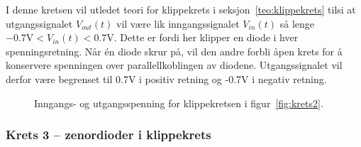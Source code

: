 \vspace{1em}

\noindent
I denne kretsen vil utledet teori for klippekrets i seksjon~\ref{teo:klippekrets} tilsi at utgangssignalet $V_{out}(t)$ vil være lik inngangssignalet $V_{in}(t)$ så lenge $-0.7\text{V} < V_{in}(t) < 0.7\text{V}$. Dette er fordi her klipper en diode i hver spenningsretning. Når én diode skrur på, vil den andre forbli åpen krets for å konservere spenningen over parallellkoblingen av diodene. Utgangssignalet vil derfor være begrenset til 0.7V i positiv retning og -0.7V i negativ retning.

\vspace{3em}

\begin{figure}[H]
\centering
{}
\caption{Inngangs- og utgangsspenning for klippekretsen i figur~\ref{fig:krets2}.}
\label{fig:krets2_in_out}
\end{figure}

\subsubsection{Krets 3 -- zenordioder i klippekrets}

